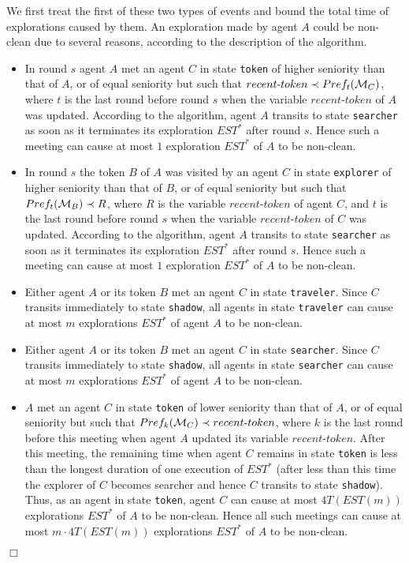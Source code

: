\documentclass[11pt]{article}
\newcommand{\qed}{\hfill $\Box$ \bigbreak}
\newenvironment{proof}{\noindent {\bf Proof.}}{\qed}
\newcommand{\cM}{{\cal M}}
\begin{document}
\begin{proof}
 We first treat the first of these two types of events and bound the total time of explorations caused by them.
 An exploration {made by agent $A$} could be non-clean due to several reasons,
 according to the description of the algorithm.
 \begin{itemize}
 \item
{{In round $s$} agent $A$ met an agent $C$ in state {\tt token} of higher seniority than that of $A$, or of equal seniority but such
  that $recent\mbox{-}token\prec Pref_t( \cM_C)$, {where $t$ is the last round before round $s$ when the variable $recent$-$token$ of $A$ was updated.} According to the algorithm, agent $A$ transits to state {\tt searcher} as soon as it terminates its exploration $EST^*$ after round $s$. Hence such a meeting can cause at most $1$ exploration $EST^*$ of $A$ to be non-clean.}
\item
  {{In round $s$ the token $B$ of $A$ was visited by an agent $C$ in state {\tt explorer} of higher seniority than that of $B$,
     or of equal seniority but such that $Pref_t(\cM_B) \prec R$, where $R$ is the variable $recent$-$token$ of agent $C$, and $t$ is the last round before round $s$ when the variable $recent$-$token$ of $C$ was updated. According to the algorithm, agent $A$ transits to state {\tt searcher} as soon as it terminates its exploration $EST^*$ after round $s$. Hence such a meeting can cause at most $1$ exploration $EST^*$ of $A$ to be non-clean.}}

     \item
     Either agent $A$ or its token $B$ met an agent $C$ in state {\tt traveler}. Since $C$ transits immediately to state {\tt shadow}, all agents in state {\tt traveler}
    {can cause at most $m$ explorations $EST^*$ of agent $A$ to be non-clean.}
       \item
     Either agent $A$ or its token $B$ met an agent $C$ in state {\tt searcher}. Since $C$ transits immediately to state {\tt shadow}, all agents in state {\tt searcher}
   {can cause at most $m$ explorations $EST^*$ of agent $A$ to be non-clean.}
   \item
  {$A$ met an agent $C$  in state {\tt token} of lower seniority than that of $A$, or of equal seniority but such that $ Pref_k(\cM_C) \prec recent\mbox{-}token$, where $k$ is the last round before this meeting when agent $A$ updated its variable $recent\mbox{-}token$. After this meeting,
   the remaining time when agent $C$ remains in state {\tt token} is less than the longest duration of one execution of $EST^*$ (after less than this time the explorer of $C$ becomes searcher and hence $C$ transits to state {\tt shadow}). Thus, as an agent in state {\tt token}, agent $C$ can cause at most $4T(EST(m))$ explorations $EST^*$ of $A$ to be non-clean.
Hence all such meetings can cause at most $m \cdot 4T(EST(m))$ explorations $EST^*$ of $A$ to be non-clean.} 
   

\end{itemize}
\end{proof}
\end{document}
